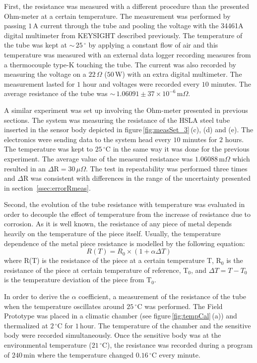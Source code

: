 \documentclass[journal,twoside,web]{ieeecolor}
\begin{document}
First, the resistance was measured with a different procedure than the presented Ohm-meter at a certain temperature. The measurement was performed by passing $1$\,A current through the tube and pooling the voltage with the 34461A digital multimeter from KEYSIGHT described previously. The temperature of the tube was kept at $\sim$\,$25$\,$^{\circ}$ by applying a constant flow of air and this temperature was measured with an external data logger recording measures from a thermocouple type-K touching the tube. The current was also recorded by measuring the voltage on a $22$\,$\Omega$ ($50$\,W) with an extra digital multimeter. The measurement lasted for $1$ hour and voltages were recorded every $10$ minutes. The average resistance of the tube was $\sim$\,$1.06091\pm37\times10^{-6}$\,m$\Omega$.

A similar experiment was set up involving the Ohm-meter presented in previous sections. The system was measuring the resistance of the HSLA steel tube inserted in the sensor body depicted in figure\,\ref{fig:measSet_3}\,(c), (d) and (e). The electronics were sending data to the system head every $10$ minutes for $2$ hours. The temperature was kept to $25$\,$^{\circ}$C in the same way it was done for the previous experiment. The average value of the measured resistance was $1.06088$\,m$\Omega$ which resulted in an $\Delta$R$=30$\,$\mu\Omega$. The test in repeatability was performed three times and $\Delta$R was consistent with differences in the range of the uncertainty presented in section~\ref{ssec:errorRmeas}.

Second, the evolution of the tube resistance with temperature was evaluated in order to decouple the effect of temperature from the increase of resistance due to corrosion. As it is well known, the resistance of any piece of metal depends heavily on the temperature of the piece itself. Usually, the temperature dependence of the metal piece resistance is modelled by the following equation:
\begin{equation}
\label{eq:tempRx}
R(T) = R_{0}\times\left(1+\alpha \Delta T\right)
\end{equation}
where R(T) is the resistance of the piece at a certain temperature T, R$_{0}$ is the resistance of the piece at certain temperature of reference, T$_{0}$, and $\Delta T=T-T_{0}$ is the temperature deviation of the piece from T$_{0}$.

In order to derive the $\alpha$ coefficient, a measurement of the resistance of the tube when the temperature oscillates around $25$\,$^{\circ}$C was performed. The Field Prototype was placed in a climatic chamber (see figure\,\ref{fig:tempCal}\,(a)) and thermalized at $2$\,$^{\circ}$C for $1$\,hour. The temperature of the chamber and the sensitive body were recorded simultaneously. Once the sensitive body was at the environmental temperature ($21$\,$^{\circ}$C), the resistance was recorded during a program of $240$\,min where the temperature changed $0.16$\,$^{\circ}$C every minute.
\end{document}
